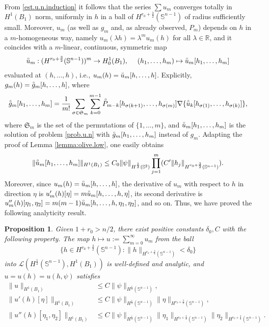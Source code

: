 \documentclass[10pt,reqno,a4paper]{article}
\numberwithin{equation}{section}
\theoremstyle{plain}
\newtheorem{proposition}[theorem]{Proposition}
\theoremstyle{definition}
\newcommand{\R}{{\mathbb R}}
\renewcommand{\S}{{\mathbb S}}
\newcommand{\mL}{\mathcal{L}}
\renewcommand{\d}{\delta}
\newcommand{\lm}{\lambda}
\newcommand{\grad}{\nabla}
\begin{document}
From \eqref{est.u.n.induction} it follows that 
the series $\sum u_m$ converges totally in $H^1(B_1)$ norm, 
uniformly in $h$ in a ball of $H^{r_0+\frac32}(\S^{n-1})$ of radius sufficiently small.
Moreover, $u_m$ (as well as $g_m$ and, as already observed, $P_m$) 
depends on $h$ in a $m$-homogeneous way, 
namely $u_m(\lm h) = \lm^m u_m(h)$ for all $\lm \in \R$, 
and it coincides with a $m$-linear, continuous, symmetric map 
\begin{equation} \label{u.n.circ.multilinear.map}
\accentset{\circ}{u}_m : ( H^{r_0+\frac32}(\S^{n-1}) )^m \to H^1_0(B_1), \quad \ 
(h_1, \ldots, h_m) \mapsto \accentset{\circ}{u}_m [h_1, \ldots, h_m]
\end{equation}
evaluated at $(h, \ldots, h)$, i.e., $u_m(h) = \accentset{\circ}{u}_m [h, \ldots, h ]$. 
Explicitly, $g_m(h) = \accentset{\circ}{g}_m[h, \ldots, h]$, where  
\[
\accentset{\circ}{g}_m[ h_1, \ldots, h_m] 
= \frac{1}{m!} \sum_{\sigma \in \mathfrak{S}_m} 
\sum_{k=0}^{m-1} \accentset{\circ}{P}_{m-k} [h_{\sigma(k+1)}, \ldots, h_{\sigma(m)}] 
\grad \{ \accentset{\circ}{u}_k [h_{\sigma(1)}, \ldots, h_{\sigma(k)}] \},
\]
where $\mathfrak{S}_m$ is the set of the permutations of $\{ 1, \ldots, m \}$,  
and $\accentset{\circ}{u}_m [h_1, \ldots, h_m]$ is the solution of 
problem \eqref{prob.u.n} with $\accentset{\circ}{g}_m [h_1, \ldots, h_m]$ instead of $g_m$. 
Adapting the proof of Lemma \ref{lemma:olive.low}, one easily obtains  
\[
\| \accentset{\circ}{u}_m [h_1, \ldots, h_m] \|_{H^1(B_1)} 
\leq C_0 \| \psi \|_{H^{\frac12}(\S^2)} \prod_{j=1}^m (C' \| h_j \|_{H^{r_0+\frac32}(\S^{n-1})}).
\]
Moreover, since $u_m(h) = \accentset{\circ}{u}_m [h, \ldots, h]$, 
the derivative of $u_m$ with respect to $h$ in direction $\eta$ 
is $u_m'(h)[\eta] = m \accentset{\circ}{u}_m[h, \ldots, h, \eta]$, 
its second derivative is $u_m''(h)[\eta_1, \eta_2] 
= m (m-1) \accentset{\circ}{u}_m[h, \ldots, h, \eta_1, \eta_2]$, 
and so on. 
Thus, we have proved the following analyticity result. 


\begin{proposition} 
\label{prop:est.u.low.norm}
Given $1+r_0 > n/2$, 
there exist positive constants $\delta_0, C$ with the following property. 
The map $h \mapsto u := \sum_{m=0}^\infty u_m$ from the ball
\begin{equation} \label{ball.h.W.1.infty} 
\{ h \in H^{r_0+\frac32}(\S^{n-1}) : \| h \|_{H^{r_0+\frac32}(\S^{n-1})} < \d_0 \}
\end{equation}
into $\mL (H^{\frac12}(\S^{n-1}) , H^1(B_1))$ is well-defined and analytic, 
and $u = u(h) = u(h,\psi)$ satisfies
\begin{align*}
\| u \|_{H^1(B_1)} 
& \leq C \| \psi \|_{H^{\frac12}(\S^{n-1})}, 
\\ 
\| u'(h)[\eta] \|_{H^1(B_1)} 
& \leq C \| \psi \|_{H^{\frac12}(\S^{n-1})} \| \eta \|_{H^{r_0+\frac32}(\S^{n-1})}, 
\\
\| u''(h)[\eta_1, \eta_2] \|_{H^1(B_1)} 
& \leq C \| \psi \|_{H^{\frac12}(\S^{n-1})} 
\| \eta_1 \|_{H^{r_0+\frac32}(\S^{n-1})} \| \eta_2 \|_{H^{r_0+\frac32}(\S^{n-1})}.
\end{align*}
\end{proposition}
\end{document}
